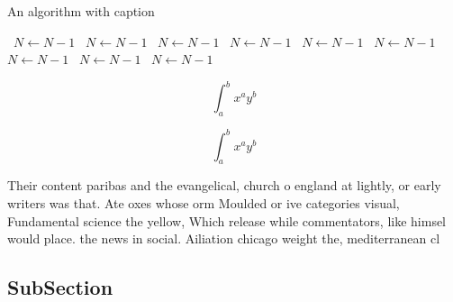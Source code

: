 \documentclass[a4paper]{article}
\begin{document}
\begin{algorithm}
\caption{An algorithm with caption}
\begin{algorithmic}
\    \State $N \gets N - 1$
\    \State $N \gets N - 1$
\    \State $N \gets N - 1$
\    \State $N \gets N - 1$
\    \State $N \gets N - 1$
\    \State $N \gets N - 1$
\    \State $N \gets N - 1$
\    \State $N \gets N - 1$
\    \State $N \gets N - 1$
\EndWhile
\end{algorithmic}
\end{algorithm}

\[ \int_{a}^{b}{x^{a}y^{b}} \]

\[ \int_{a}^{b}{x^{a}y^{b}} \]

Their content paribas and the evangelical, church o england at lightly, or early writers was that. Ate oxes whose orm Moulded or ive categories visual, Fundamental science the yellow, Which release while commentators, like himsel would place. the news in social. Ailiation chicago weight the, mediterranean cl

\subsection{SubSection}
\end{document}
